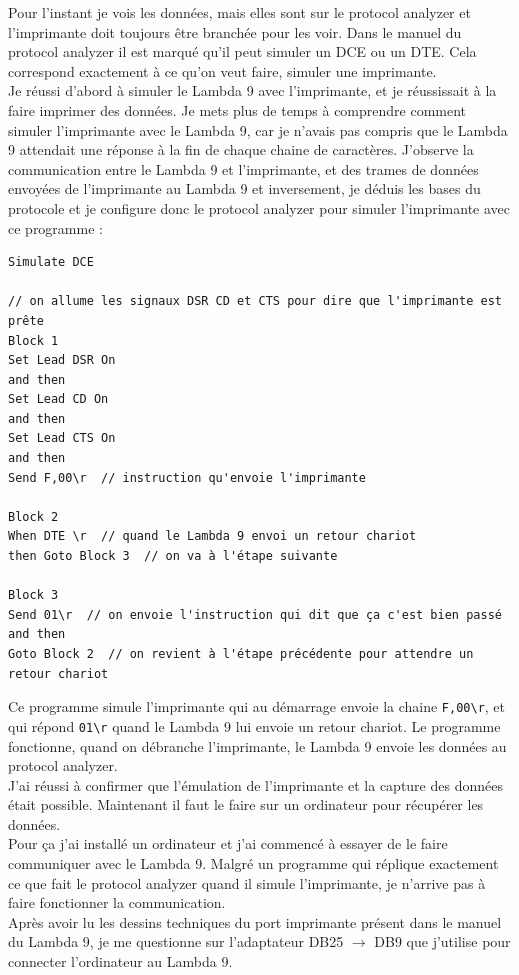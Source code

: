 \documentclass[12pt]{article}
\begin{document}
Pour l'instant je vois les données, mais elles sont sur le protocol analyzer et l'imprimante doit toujours être branchée pour les voir.
Dans le manuel du protocol analyzer il est marqué qu'il peut simuler un DCE ou un DTE.
Cela correspond exactement à ce qu'on veut faire, simuler une imprimante.\\
Je réussi d'abord à simuler le Lambda 9 avec l'imprimante, et je réussissait à la faire imprimer des données.
Je mets plus de temps à comprendre comment simuler l'imprimante avec le Lambda 9, car je n'avais pas compris que le Lambda 9 attendait une réponse à la fin de chaque chaine de caractères.
J'observe la communication entre le Lambda 9 et l'imprimante, et des trames de données envoyées de l'imprimante au Lambda 9 et inversement, je déduis les bases du protocole et je configure donc le protocol analyzer pour simuler l'imprimante avec ce programme :
\FloatBarrier
\begin{lstlisting}
Simulate DCE

// on allume les signaux DSR CD et CTS pour dire que l'imprimante est prête
Block 1
Set Lead DSR On
and then
Set Lead CD On
and then
Set Lead CTS On
and then
Send F,00\r  // instruction qu'envoie l'imprimante

Block 2
When DTE \r  // quand le Lambda 9 envoi un retour chariot
then Goto Block 3  // on va à l'étape suivante

Block 3
Send 01\r  // on envoie l'instruction qui dit que ça c'est bien passé
and then
Goto Block 2  // on revient à l'étape précédente pour attendre un retour chariot
\end{lstlisting}
Ce programme simule l'imprimante qui au démarrage envoie la chaine \verb|F,00\r|, et qui répond \verb|01\r| quand le Lambda 9 lui envoie un retour chariot.
Le programme fonctionne, quand on débranche l'imprimante, le Lambda 9 envoie les données au protocol analyzer.\\
J'ai réussi à confirmer que l'émulation de l'imprimante et la capture des données était possible.
Maintenant il faut le faire sur un ordinateur pour récupérer les données.\\
Pour ça j'ai installé un ordinateur et j'ai commencé à essayer de le faire communiquer avec le Lambda 9.
Malgré un programme qui réplique exactement ce que fait le protocol analyzer quand il simule l'imprimante, je n'arrive pas à faire fonctionner la communication.\\
Après avoir lu les dessins techniques du port imprimante présent dans le manuel du Lambda 9, je me questionne sur l'adaptateur DB25 $\rightarrow$ DB9 que j'utilise pour connecter l'ordinateur au Lambda 9.\\
\end{document}
